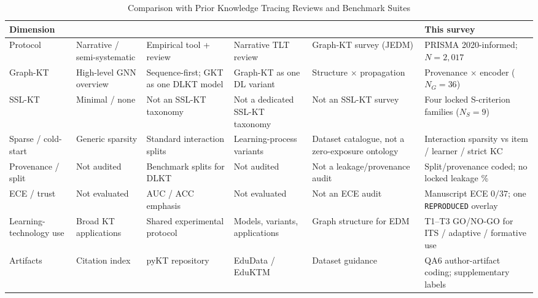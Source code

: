 \documentclass[lettersize,journal]{IEEEtran}
\begin{document}
\begin{table}[t]
\caption{Comparison with Prior Knowledge Tracing Reviews and Benchmark Suites}
\label{tab:survey_comparison}
\centering
\footnotesize
\setlength{\tabcolsep}{3.4pt}
\begin{tabular}{@{}>{\raggedright\arraybackslash}p{2.15cm}
>{\raggedright\arraybackslash}p{2.25cm}
>{\raggedright\arraybackslash}p{2.35cm}
>{\raggedright\arraybackslash}p{2.25cm}
>{\raggedright\arraybackslash}p{2.35cm}
>{\raggedright\arraybackslash}p{2.55cm}@{}}
\toprule
\textbf{Dimension} & \cite{Abdelrahman_Survey_2023} & \cite{Liu_pyKT_2022,Liu_DLKT_2025} & \cite{Shen_KTSurvey_2024} & \cite{Xu_GbKT_2026} & \textbf{This survey} \\
\midrule
Protocol & Narrative / semi-systematic & Empirical tool + review & Narrative TLT review & Graph-KT survey (JEDM) & PRISMA 2020-informed; $N=2{,}017$ \\
Graph-KT & High-level GNN overview & Sequence-first; GKT as one DLKT model & Graph-KT as one DL variant & Structure $\times$ propagation & Provenance $\times$ encoder ($N_G=36$) \\
SSL-KT & Minimal / none & Not an SSL-KT taxonomy & Not a dedicated SSL-KT taxonomy & Not an SSL-KT survey & Four locked S-criterion families ($N_S=9$) \\
Sparse / cold-start & Generic sparsity & Standard interaction splits & Learning-process variants & Dataset catalogue, not a zero-exposure ontology & Interaction sparsity vs item / learner / strict KC \\
Provenance / split & Not audited & Benchmark splits for DLKT & Not audited & Not a leakage/provenance audit & Split/provenance coded; no locked leakage \% \\
ECE / trust & Not evaluated & AUC / ACC emphasis & Not evaluated & Not an ECE audit & Manuscript ECE $0/37$; one \texttt{REPRODUCED} overlay \\
Learning-technology use & Broad KT applications & Shared experimental protocol & Models, variants, applications & Graph structure for EDM & T1--T3 GO/NO-GO for ITS / adaptive / formative use \\
Artifacts & Citation index & pyKT repository & EduData / EduKTM & Dataset guidance & QA6 author-artifact coding; supplementary labels \\
\bottomrule
\end{tabular}
\end{table}
\end{document}
